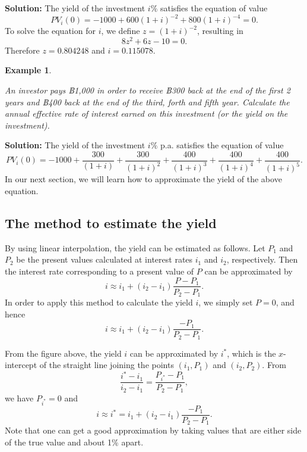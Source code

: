 \documentclass[landscape, 20pt]{extreport}
\theoremstyle{definition}
\theoremstyle{definition}
\newtheorem{example}{Example}[chapter]
\theoremstyle{definition}
\theoremstyle{definition}
\theoremstyle{remark}
\begin{document}
\textbf{Solution:} The yield of the investment \(i\%\) satisfies the equation
of value \[PV_i(0) =  -1000 + 600(1+i)^{-2} + 800(1+i)^{-4} = 0.\] To
solve the equation for \(i\), we define \(z = (1+i)^{-2}\), resulting in
\[8z^2 + 6z - 10 = 0.\] Therefore \(z = 0.804248\) and \(i = 0.115078.\)

\newpage \begin{example}
\protect\hypertarget{exm:exampleYield}{}\label{exm:exampleYield}

\emph{An investor pays ฿1,000 in order to receive ฿300 back
at the end of the first 2 years and ฿400 back at the end of the third,
forth and fifth year. Calculate the annual effective rate of interest
earned on this investment (or the yield on the investment).}

\end{example}

\textbf{Solution:} The yield of the investment \(i\%\) p.a. satisfies the
equation of value
\[PV_i(0) =  -1000 + \frac{300}{(1+i)} + \frac{300}{(1+i)^{2}} + \frac{400}{(1+i)^{3}} +  \frac{400}{(1+i)^{4}} + \frac{400}{(1+i)^{5}}.\]
In our next section, we will learn how to approximate the yield of the
above equation.

\hypertarget{the-method-to-estimate-the-yield}{%
\subsection{The method to estimate the yield}\label{the-method-to-estimate-the-yield}}

By using linear interpolation, the yield can be estimated as follows.
Let \(P_1\) and \(P_2\) be the present values calculated at interest rates
\(i_1\) and \(i_2\), respectively. Then the interest rate corresponding to a
present value of \(P\) can be approximated by
\[i \approx i_1 + (i_2 - i_1) \frac{P - P_1}{P_2 - P_1}.\] In order to
apply this method to calculate the yield \(i\), we simply set \(P = 0\), and
hence \[i \approx i_1 + (i_2 - i_1) \frac{ - P_1}{P_2 - P_1}.\]

From the figure above, the yield \(i\) can be approximated by \(i^*\), which
is the \(x\)-intercept of the straight line joining the points \((i_1,P_1)\)
and \((i_2,P_2)\). From
\[\frac{i^* -i_1}{i_2 - i_1} = \frac{P_{i^*} - P_1}{P_2 - P_1},\] we
have \(P_{i^*} = 0\) and
\[i \approx i^* =  i_1 + (i_2 - i_1) \frac{ - P_1}{P_2 - P_1}.\] Note
that one can get a good approximation by taking values that are either
side of the true value and about 1\% apart.
\end{document}
